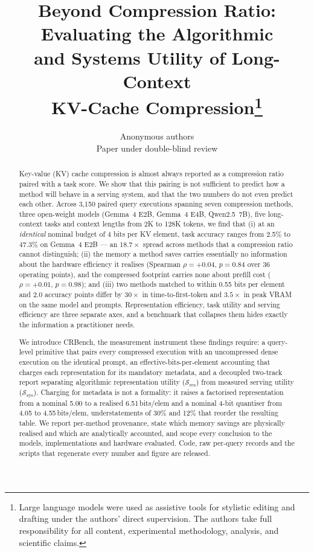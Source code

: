 \documentclass{article}
\title{Beyond Compression Ratio: Evaluating the Algorithmic\\ and Systems Utility of Long-Context\\ KV-Cache Compression\thanks{Large language models were used as assistive tools for stylistic editing and drafting under the authors' direct supervision. The authors take full responsibility for all content, experimental methodology, analysis, and scientific claims.}}
\author{\name Anonymous authors \\
        \addr Paper under double-blind review}
\theoremstyle{definition}
\newcommand{\Sres}{\mathcal{S}_{\text{res}}}
\newcommand{\Ssys}{\mathcal{S}_{\text{sys}}}
\newcommand{\bpt}{\,bits/elem}
\begin{document}
\maketitle

\begin{abstract}
Key-value (KV) cache compression is almost always reported as a compression ratio paired with a task score. We show that this pairing is not sufficient to predict how a method will behave in a serving system, and that the two numbers do not even predict each other. Across 3{,}150 paired query executions spanning seven compression methods, three open-weight models (Gemma~4 E2B, Gemma~4 E4B, Qwen2.5~7B), five long-context tasks and context lengths from 2K to 128K tokens, we find that (i) at an \emph{identical} nominal budget of 4 bits per KV element, task accuracy ranges from 2.5\% to 47.3\% on Gemma~4 E2B --- an $18.7\times$ spread across methods that a compression ratio cannot distinguish; (ii) the memory a method saves carries essentially no information about the hardware efficiency it realises (Spearman $\rho = {+}0.04$, $p = 0.84$ over 36 operating points), and the compressed footprint carries none about prefill cost ($\rho = {+}0.01$, $p = 0.98$); and (iii) two methods matched to within 0.55 bits per element and 2.0 accuracy points differ by $30\times$ in time-to-first-token and $3.5\times$ in peak VRAM on the same model and prompts. Representation efficiency, task utility and serving efficiency are three separate axes, and a benchmark that collapses them hides exactly the information a practitioner needs.

We introduce CRBench, the measurement instrument these findings require: a query-level primitive that pairs every compressed execution with an uncompressed dense execution on the identical prompt, an effective-bits-per-element accounting that charges each representation for its mandatory metadata, and a decoupled two-track report separating algorithmic representation utility ($\Sres$) from measured serving utility ($\Ssys$). Charging for metadata is not a formality: it raises a factorised representation from a nominal 5.00 to a realised 6.51\bpt{} and a nominal 4-bit quantiser from 4.05 to 4.55\bpt{}, understatements of 30\% and 12\% that reorder the resulting table. We report per-method provenance, state which memory savings are physically realised and which are analytically accounted, and scope every conclusion to the models, implementations and hardware evaluated. Code, raw per-query records and the scripts that regenerate every number and figure are released.
\end{abstract}
\end{document}
